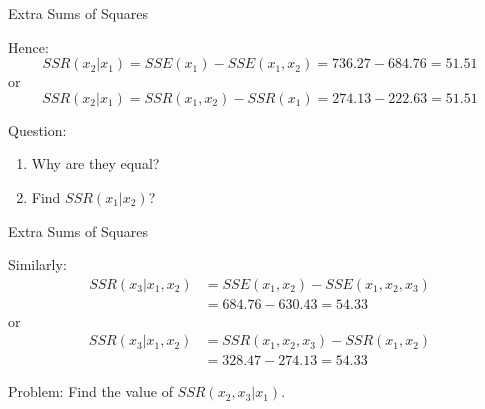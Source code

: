 \documentclass[
  ignorenonframetext,
]{beamer}
\providecommand{\tightlist}{%
  \setlength{\itemsep}{0pt}\setlength{\parskip}{0pt}}
\begin{document}
\begin{frame}{Extra Sums of Squares}
\label{extra-sums-of-squares-2}
\begin{table}[h]
\centering
{}
\end{table}

Hence: \[SSR(x_2|x_1)=SSE(x_1)-SSE(x_1, x_2)=736.27-684.76=51.51\] or
\[SSR(x_2|x_1)=SSR(x_1,x_2)-SSR(x_1)=274.13-222.63=51.51\]

Question:

\begin{enumerate}
\tightlist
\item
  Why are they equal?
\item
  Find \(SSR(x_1|x_2)\)?
\end{enumerate}
\end{frame}

\begin{frame}{Extra Sums of Squares}
\label{extra-sums-of-squares-3}
\begin{table}[h]
\centering
{}
\end{table}

Similarly:
\[\begin{array}{ll}SSR(x_3|x_1,x_2)&=SSE(x_1,x_2)-SSE(x_1, x_2, x_3)\\
&=684.76-630.43=54.33\end{array}\] or
\[\begin{array}{ll}SSR(x_3|x_1,x_2)&=SSR(x_1,x_2,x_3)-SSR(x_1,x_2)\\
&=328.47-274.13=54.33\end{array}\]

Problem: Find the value of \(SSR(x_2,x_3|x_1)\).
\end{frame}
\end{document}
